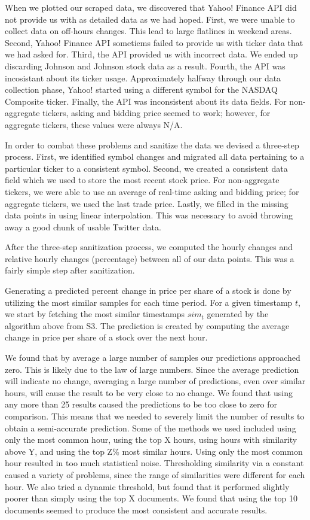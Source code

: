 \documentclass[twocolumn]{article}
\begin{document}
When we plotted our scraped data, we discovered that Yahoo! Finance API did not provide us with as detailed data as we had hoped. First, we were unable to collect data on off-hours changes. This lead to large flatlines in weekend areas. Second, Yahoo! Finance API sometiems failed to provide us with ticker data that we had asked for. Third, the API provided us with incorrect data. We ended up discarding Johnson and Johnson stock data as a result. Fourth, the API was incosistant about its ticker usage. Approximately halfway through our data collection phase, Yahoo! started using a different symbol for the NASDAQ Composite ticker. Finally, the API was inconsistent about its data fields. For non-aggregate tickers, asking and bidding price seemed to work; however, for aggregate tickers, these values were always N/A.

In order to combat these problems and sanitize the data we devised a three-step process. First, we identified symbol changes and migrated all data pertaining to a particular ticker to a consistent symbol. Second, we created a consistent data field which we used to store the most recent stock price. For non-aggregate tickers, we were able to use an average of real-time asking and bidding price; for aggregate tickers, we used the last trade price. Lastly, we filled in the missing data points in using linear interpolation. This was necessary to avoid throwing away a good chunk of usable Twitter data.

After the three-step sanitization process, we computed the hourly changes and relative hourly changes (percentage) between all of our data points. This was a fairly simple step after sanitization.

Generating a predicted percent change in price per share of a stock is done by utilizing the most similar samples for each time period. For a given timestamp $t$, we start by fetching the most similar timestamps $sim_t$ generated by the algorithm above from S3. The prediction is created by computing the average change in price per share of a stock over the next hour. 

We found that by average a large number of samples our predictions approached zero. This is likely due to the law of large numbers. Since the average prediction will indicate no change, averaging a large number of predictions, even over similar hours, will cause the result to be very close to no change. We found that using any more than 25 results caused the predictions to be too close to zero for comparison. This means that we needed to severely limit the number of results to obtain a semi-accurate prediction. Some of the methods we used included using only the most common hour, using the top X hours, using hours with similarity above Y, and using the top Z\% most similar hours. Using only the most common hour resulted in too much statistical noise. Thresholding similarity via a constant caused a variety of problems, since the range of similarities were different for each hour. We also tried a dynamic threshold, but found that it performed slightly poorer than simply using the top X documents. We found that using the top 10 documents seemed to produce the most consistent and accurate results.
\end{document}
